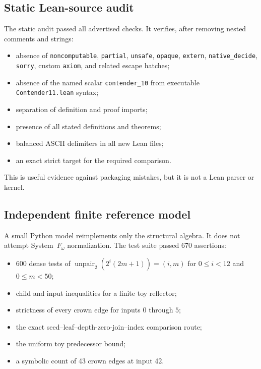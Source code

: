 \documentclass[11pt]{article}
\theoremstyle{definition}
\theoremstyle{remark}
\newcommand{\code}[1]{\texttt{#1}}
\begin{document}
\subsection{Static Lean-source audit}

The static audit passed all advertised checks.  It verifies, after removing
nested comments and strings:

\begin{itemize}
\item absence of \code{noncomputable}, \code{partial}, \code{unsafe},
\code{opaque}, \code{extern}, \code{native\_decide}, \code{sorry}, custom
\code{axiom}, and related escape hatches;
\item absence of the named scalar \code{contender\_10} from executable
\code{Contender11.lean} syntax;
\item separation of definition and proof imports;
\item presence of all stated definitions and theorems;
\item balanced ASCII delimiters in all new Lean files;
\item an exact strict target for the required comparison.
\end{itemize}

This is useful evidence against packaging mistakes, but it is not a Lean parser
or kernel.

\subsection{Independent finite reference model}

A small Python model reimplements only the structural algebra.  It does not
attempt System~$F_\omega$ normalization.  The test suite passed 670 assertions:

\begin{itemize}
\item 600 dense tests of
$\operatorname{unpair}_2(2^i(2m+1))=(i,m)$ for
$0\le i<12$ and $0\le m<50$;
\item child and input inequalities for a finite toy reflector;
\item strictness of every crown edge for inputs $0$ through $5$;
\item the exact seed--leaf--depth-zero-join--index comparison route;
\item the uniform toy predecessor bound;
\item a symbolic count of 43 crown edges at input 42.
\end{itemize}
\end{document}
